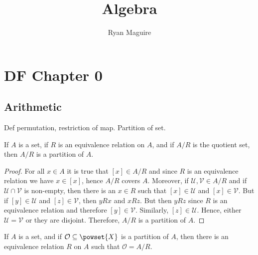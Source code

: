 \documentclass{article}                                                        %
\begin{document}
    \title{Algebra}
    \author{Ryan Maguire}
    \date{\vspace{-5ex}}
    \maketitle
    \tableofcontents
    \clearpage
    \section{DF Chapter 0}
        \subsection{Arithmetic}
            Def permutation, restriction of map. Partition of set.
            \begin{theorem}
                \label{thm:Equiv_Classes_Form_Partition}%
                If $A$ is a set, if $R$ is an equivalence relation on $A$, and
                if $A/R$ is the quotient set, then $A/R$ is a partition of $A$.
            \end{theorem}
            \begin{proof}
                For all $x\in{A}$ it is true that $[x]\in{A}/R$ and since $R$ is
                an equivalence relation we have $x\in[x]$, hence $A/R$ covers
                $A$. Moreover, if $\mathcal{U},\mathcal{V}\in{A}/R$ and if
                $\mathcal{U}\cap\mathcal{V}$ is non-empty, then there is an
                $x\in{R}$ such that $[x]\in\mathcal{U}$ and $[x]\in\mathcal{V}$.
                But if $[y]\in\mathcal{U}$ and $[z]\in\mathcal{V}$, then
                $yRx$ and $xRz$. But then $yRz$ since $R$ is an equivalence
                relation and therefore $[y]\in\mathcal{V}$. Similarly,
                $[z]\in\mathcal{U}$. Hence, either $\mathcal{U}=\mathcal{V}$ or
                they are disjoint. Therefore, $A/R$ is a partition of $A$.
            \end{proof}
            \begin{theorem}
                If $A$ is a set, and if $\mathcal{O}\subseteq\powset{X}$ is a
                partition of $A$, then there is an equivalence relation $R$ on
                $A$ such that $\mathcal{O}=A/R$.
            \end{theorem}
\end{document}
